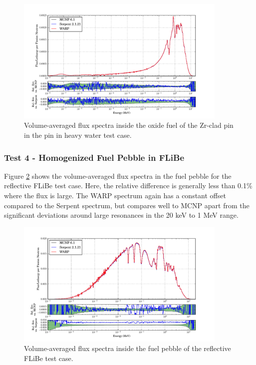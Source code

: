 \documentclass[preprint,12pt]{elsarticle}
\begin{document}
\begin{figure}[h!]
\centering
\includegraphics[width=0.9\textwidth,trim= 1cm 0cm 1cm 0cm]{graphics/pincell_spec.pdf}
\caption{Volume-averaged flux spectra inside the oxide fuel of the Zr-clad pin in the pin in heavy water test case. \label{pincell_spec} }
\end{figure}

\newpage
\subsubsection{Test 4 - Homogenized Fuel Pebble in FLiBe}

Figure \ref{flibe_spec} shows the volume-averaged flux spectra in the fuel pebble for the reflective FLiBe test case.  Here, the relative difference is generally less than 0.1\% where the flux is large.  The WARP spectrum again has a constant offset compared to the Serpent spectrum, but compares well to MCNP apart from the significant deviations around large resonances in the 20 keV to 1 MeV range.  

\begin{figure}[h!]
\centering
\includegraphics[width=0.9\textwidth,trim= 1cm 0cm 1cm 0cm]{graphics/flibe_spec.pdf}
\caption{Volume-averaged flux spectra inside the fuel pebble of the reflective FLiBe test case. \label{flibe_spec} }
\end{figure}
\end{document}
